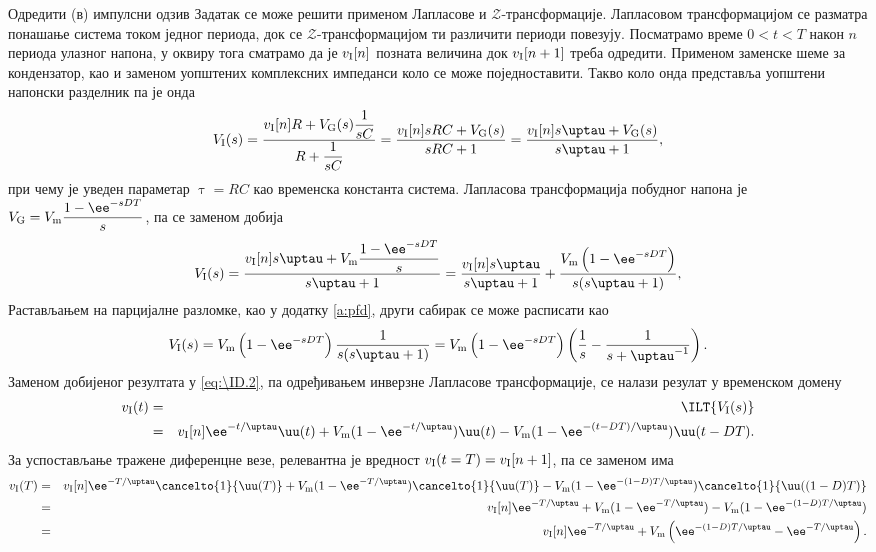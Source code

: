     Одредити (в) импулсни одзив
Задатак се може решити применом Лапласове и $\mathcal{Z}$-трансформације. Лапласовом трансформацијом се разматра понашање система током једног периода, 
док се $\mathcal{Z}$-трансформацијом ти различити периоди повезују. Посматрамо време $0 < t < T$ након $n$ периода улазног напона, у оквиру тога 
сматрамо да је $v_{\rm I}[n]$ позната величина док $v_{\rm I}[n+1]$ треба одредити. Применом заменске шеме за кондензатор, као и заменом уопштених 
комплексних импеданси коло се може поједноставити. Такво коло онда представља уопштени напонски разделник па је онда 
\begin{eqnarray}
    V_{\rm I}(s) = \dfrac{v_{\rm I}[n] R + V_{\rm G}(s) \dfrac{1}{sC}}{R + \dfrac{1}{sC}} = 
    \dfrac{v_{\rm I}[n] sRC + V_{\rm G}(s) }{sRC + 1} = \dfrac{v_{\rm I}[n] s \uptau + V_{\rm G}(s) }{s\uptau + 1},
\end{eqnarray}
при чему је уведен параметар $\uptau = RC$ као временска константа система. Лапласова трансформација побудног напона је 
$V_{\rm G} = V_{\rm m}\dfrac{1 - \ee^{-sDT}}{s}$, па се заменом добија 
\begin{eqnarray}
    V_{\rm I}(s) = \dfrac{v_{\rm I}[n] s \uptau + V_{\rm m}\dfrac{1 - \ee^{-sDT}}{s} }{s\uptau + 1} =
       \dfrac{v_{\rm I}[n] s \uptau }{s \uptau + 1} +
       \dfrac{V_{\rm m}\left(1 - \ee^{-sDT}\right) }{s(s\uptau + 1)}, \label{eq:\ID.2}
\end{eqnarray}
Растављањем на парцијалне разломке, као у додатку \ref{a:pfd}, други сабирак се може расписати као  
\begin{eqnarray}
    V_{\rm I}(s) = 
    V_{\rm m} \left(1 - \ee^{-sDT}\right) \dfrac{ 1 }{s(s\uptau + 1)} 
    = 
    V_{\rm m} \left(1 - \ee^{-sDT}\right) \left(\dfrac{1}{s} - \dfrac{1}{s + \uptau^{-1}} \right).
\end{eqnarray}
Заменом добијеног резултата у \eqref{eq:\ID.2}, па одређивањем инверзне Лапласове трансформације, се налази резулат у временском домену
\begin{eqnarray}
    v_{\rm I}(t) &=& \ILT{V_{\rm I}(s)} \\
    &=& 
    v _{\rm I}[n] \ee^{-t/\uptau} \uu(t)
    +
    V_{\rm m}(1 - \ee^{-t/\uptau}) \uu(t)
    -
    V_{\rm m}(1 - \ee^{-(t-DT)/\uptau}) \uu(t-DT).
\end{eqnarray}
За успостављање тражене диференцне везе, релевантна је вредност $v_{\rm I}(t = T) = v_{\rm I}[n+1]$, па се заменом има
\begin{eqnarray}
    v_{\rm I}(T)
    &=&
    v _{\rm I}[n] \ee^{-T/\uptau} \cancelto{1}{\uu(T)}
    +
    V_{\rm m}(1 - \ee^{-T/\uptau}) \cancelto{1}{\uu(T)}
    -
    V_{\rm m}(1 - \ee^{-(1-D)T/\uptau}) \cancelto{1}{\uu((1-D)T)}
    \\
    &=&
    v _{\rm I}[n] \ee^{-T/\uptau}
    +
    V_{\rm m}(1 - \ee^{-T/\uptau})
    -
    V_{\rm m}(1 - \ee^{-(1-D)T/\uptau})
    \\ 
    &=&
    v _{\rm I}[n] \ee^{-T/\uptau}
    +
    V_{\rm m}
    \left(
         \ee^{-(1-D)T/\uptau} - \ee^{-T/\uptau}
    \right).
\end{eqnarray}
